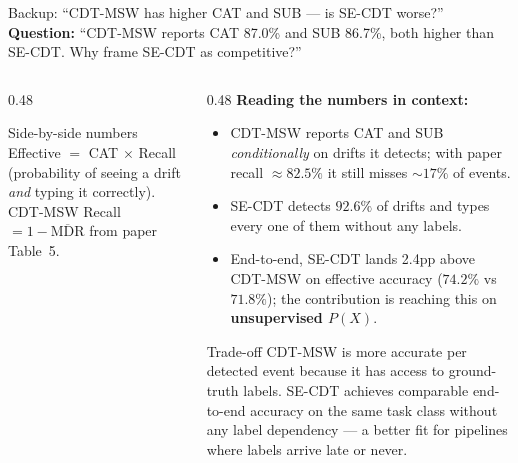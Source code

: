 \documentclass[aspectratio=169,10pt]{beamer}
\begin{document}
\begin{frame}{Backup: ``CDT-MSW has higher CAT and SUB --- is SE-CDT worse?''}
	\textbf{Question:} ``CDT-MSW reports CAT 87.0\% and SUB 86.7\%, both higher than SE-CDT. Why frame SE-CDT as competitive?''

	\vspace{0.5em}
	\begin{columns}[T]
		\begin{column}{0.48\textwidth}
			\begin{block}{Side-by-side numbers}
				{\small
				}
				\vspace{0.2em}
				{\scriptsize Effective $=$ CAT $\times$ Recall (probability of seeing a drift \emph{and} typing it correctly). CDT-MSW Recall $= 1 - \overline{\text{MDR}}$ from paper Table~5.}
			\end{block}
		\end{column}
		\begin{column}{0.48\textwidth}
			\textbf{Reading the numbers in context:}
			\begin{itemize}
				\item CDT-MSW reports CAT and SUB \textit{conditionally} on drifts it detects; with paper recall $\approx 82.5\%$ it still misses $\sim 17\%$ of events.
				\item SE-CDT detects $92.6\%$ of drifts and types every one of them without any labels.
				\item End-to-end, SE-CDT lands 2.4pp above CDT-MSW on effective accuracy ($74.2\%$ vs $71.8\%$); the contribution is reaching this on \textbf{unsupervised $P(X)$}.
			\end{itemize}

			\vspace{0.3em}
			\begin{alertblock}{Trade-off}
				\small
				CDT-MSW is more accurate per detected event because it has access to ground-truth labels. SE-CDT achieves comparable end-to-end accuracy on the same task class without any label dependency --- a better fit for pipelines where labels arrive late or never.
			\end{alertblock}
		\end{column}
	\end{columns}
\end{frame}
\end{document}
